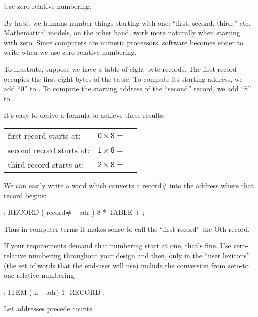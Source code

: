 \begin{tip}
Use zero-relative numbering.
\end{tip}
By habit we humans number things starting with one: ``first, second,
third,'' etc. Mathematical models, on the other hand, work more naturally
when starting with zero. Since computers are numeric processors, software
becomes easier to write when we use zero-relative numbering.

To illustrate, suppose we have a table of eight-byte records. The
first record occupies the first eight bytes of the table. To compute its
starting address, we add ``0'' to . To compute the starting address
of the ``second'' record, we add ``8'' to .



It's easy to derive a formula to achieve these results:

\bigskip
\begin{tabular}{@{}l@{ }l@{}r}
\sf first record starts at:  &  $\mathsf{0 \times 8} = {}$ & \sf 0  \\
\sf second record starts at: &  $\mathsf{1 \times 8} = {}$ & \sf 8  \\
\sf third record starts at:  &  $\mathsf{2 \times 8} = {}$ & \sf 16 \\
\end{tabular}
\bigskip

We can easily write a word which converts a record\# into the address
where that record begins:

\begin{Code}
: RECORD  ( record# -- adr )
   8 *  TABLE + ;
\end{Code}
Thus in computer terms it makes sense to call the ``first record'' the Oth
record.

If your requirements demand that numbering start at one, that's
fine. Use zero-relative numbering throughout your design and then, only
in the ``user lexicons'' (the set of words that the end-user will use)
include the conversion from zero-to one-relative numbering:
\begin{Code}
: ITEM  ( n -- adr)  1- RECORD ;
\end{Code}

\begin{tip}
Let addresses precede counts.
\end{tip}

